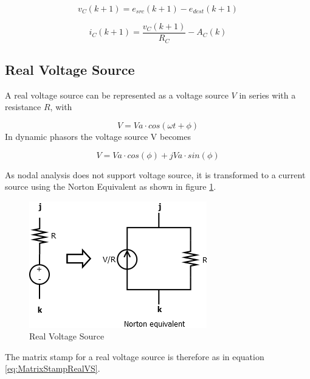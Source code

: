 \begin{equation}
v_C(k+1) = e_{src}(k+1) - e_{dest}(k+1)
\end{equation}

\begin{equation}
i_C(k+1) = \frac{v_C(k+1)}{R_C} - A_C(k)
\end{equation}
 

\subsection{Real Voltage Source} \label{sub:RealVoltageSource}

A real voltage source can be represented as a voltage source $V$ in series with a resistance $R$, with

\begin{equation}
V=Va \cdot cos(\omega t + \phi)
\end{equation}
In dynamic phasors the voltage source V becomes

\begin{equation}
V = Va \cdot cos (\phi) + jVa \cdot sin(\phi) 
\end{equation}

As nodal analysis does not support voltage source, it is transformed to a current source using the Norton Equivalent as shown in figure \ref{fig:Real_Voltage_Source}.

\begin{figure}[ht]
	\centering
	\includegraphics[scale=0.6]{img/RealVoltageSource.png} 
	\caption{Real Voltage Source}
	\label{fig:Real_Voltage_Source}
\end{figure}

The matrix stamp for a real voltage source is therefore as in equation \ref{eq:MatrixStampRealVS}.

